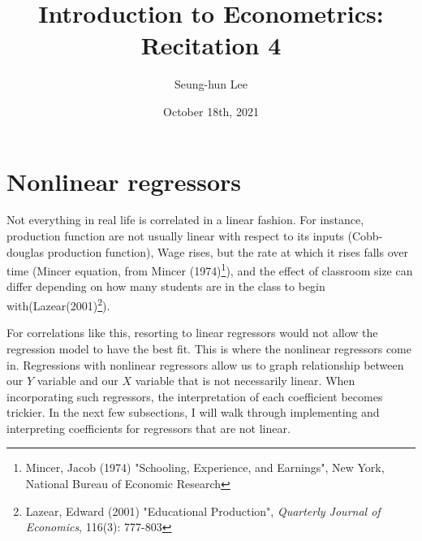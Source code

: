 \documentclass[12pt]{article}
\title{Introduction to Econometrics: Recitation 4}
\theoremstyle{definition}
\theoremstyle{property}
\theoremstyle{assumption}
\theoremstyle{example}
\theoremstyle{comment}
\begin{document}
\linespread{1.25}
\author{Seung-hun Lee}
\date{October 18th, 2021 }
\maketitle

\section{Nonlinear regressors}
Not everything in real life is correlated in a linear fashion. For instance, production function are not usually linear with respect to its inputs (Cobb-douglas production function), Wage rises, but the rate at which it rises falls over time (Mincer equation, from Mincer (1974)\footnote{\scriptsize{Mincer, Jacob (1974) "Schooling, Experience, and Earnings", New York, National Bureau of Economic Research}}), and the effect of classroom size can differ depending on how many students are in the class to begin with(Lazear(2001)\footnote{\scriptsize{Lazear, Edward (2001) "Educational Production", \textit{Quarterly Journal of Economics}, 116(3): 777-803}}). \par\medskip
For correlations like this, resorting to linear regressors would not allow the regression model to have the best fit. This is where the nonlinear regressors come in. Regressions with nonlinear regressors allow us to graph relationship between our $Y$ variable and our $X$ variable that is not necessarily linear. When incorporating such regressors, the interpretation of each coefficient becomes trickier. In the next few subsections, I will walk through implementing and interpreting coefficients for regressors that are not linear. \par\medskip
\end{document}
